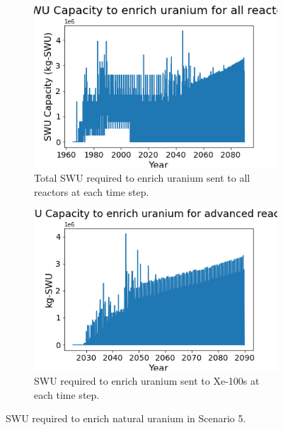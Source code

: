 \begin{figure}
    \centering
    \begin{subfigure}{0.4\textwidth}
        \centering
        \includegraphics[scale=0.3]{figures/totalswu_scenarios_5.png}
        \caption{Total \gls{SWU} required to enrich uranium sent to all reactors at each time step.}
        \label{fig:totalswu_5}
    \end{subfigure}
    \begin{subfigure}{0.4\textwidth}
        \centering
        \includegraphics[scale=0.3]{figures/haleuSWU_scenarios_5.png}
        \caption{\gls{SWU} required to enrich uranium sent to Xe-100s at each time step.}
        \label{fig:haleuswu_5}
    \end{subfigure}
    \caption{\gls{SWU} required to enrich natural uranium in Scenario 5.}
    \label{fig:swu_5}
\end{figure}
